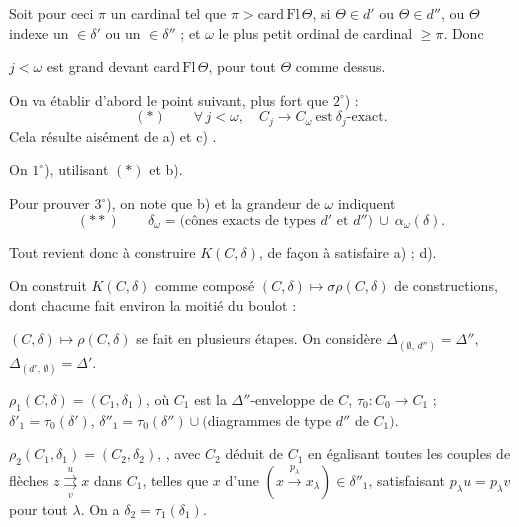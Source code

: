\documentclass[11pt,a4paper]{article}
\begin{document}
\struck{\ill{}} Soit pour ceci $\pi$ un cardinal tel que
$\pi > \mathrm{card}\,\mathrm{Fl}\,\Theta$, \struck{\ill{}} si $\Theta \in d'$ ou
$\Theta \in d''$, ou $\Theta$ \struck{\ill{}} indexe un $\in \delta'$ ou un
$\in \delta''$ ; et $\omega$ le plus petit ordinal de cardinal $\geqslant \pi$.
Donc \ill{}

$j < \omega$ est grand devant $\mathrm{card}\,\mathrm{Fl}\,\Theta$, pour tout
$\Theta$ comme dessus.

On va établir d'abord le point suivant, plus fort que $2^{\circ}$) :
\[
  (*) \qquad \forall\, j < \omega, \quad C_j \to C_\omega \ \text{est}\ \delta_j\text{-exact}.
\]
Cela résulte aisément de a) et c) .

On   $1^{\circ}$), utilisant $(*)$ et b).

Pour prouver $3^{\circ}$), on note que b)  et la grandeur de $\omega$
indiquent
\[
  (**) \qquad \delta_\omega = \text{(cônes exacts de types $d'$ et $d''$)}
  \ \cup\ \alpha_\omega(\delta).
\]

Tout revient donc à construire $K(C,\delta)$, de façon à satisfaire a) ; d).

On construit  $K(C,\delta)$ comme composé
$(C,\delta) \mapsto \sigma\rho(C,\delta)$ de  constructions,
dont chacune fait environ la moitié du boulot :

$(C,\delta) \mapsto \rho(C,\delta)$ se fait en plusieurs étapes. On considère
$\Delta_{(\emptyset,\, d'')} = \Delta''$, $\Delta_{(d',\, \emptyset)} = \Delta'$.


$\rho_1(C,\delta) = (C_1, \delta_1)$, où $C_1$ est la $\Delta''$-enveloppe de
$C$, $\tau_0 : C_0 \to C_1$ ;
$\delta'_1 = \tau_0(\delta')$,
$\delta''_1 = \tau_0(\delta'') \cup ($diagrammes de type $d''$ de $C_1)$.

$\rho_2(C_1, \delta_1) = (C_2, \delta_2)$, , avec
$C_2$ déduit de $C_1$ en égalisant toutes les couples de flèches
$z \overset{u}{\underset{v}{\rightrightarrows}} x$ dans $C_1$, telles que
\ill{} $x$ d'une $(x \xrightarrow{\,p_\lambda\,} x_\lambda) \in \delta''_1$,
satisfaisant $p_\lambda u = p_\lambda v$ pour tout $\lambda$. On a
$\delta_2 = \tau_1(\delta_1)$.
\end{document}

